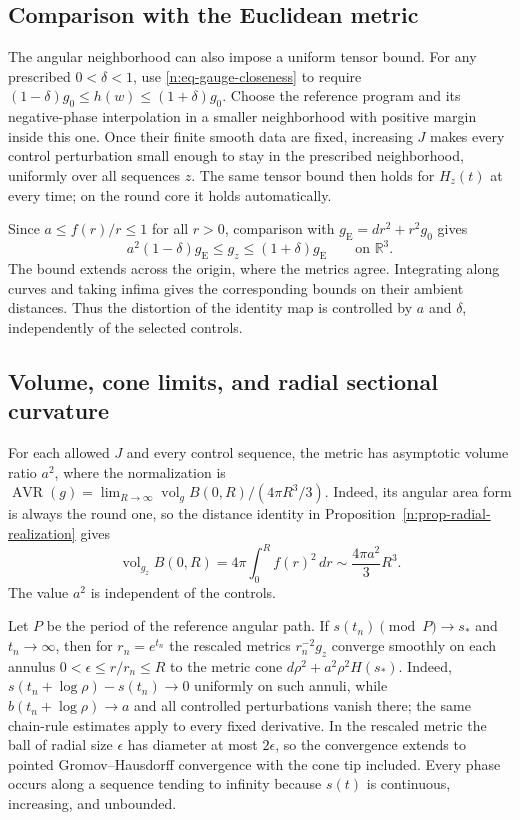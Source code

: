\subsection{Comparison with the Euclidean metric}
The angular neighborhood can also impose a uniform tensor bound. For
any prescribed $0<\delta<1$, use \eqref{n:eq-gauge-closeness} to require
$(1-\delta)g_0\le h(w)\le(1+\delta)g_0$.
Choose the reference program and its negative-phase interpolation in a
smaller neighborhood with positive margin inside this one. Once their
finite smooth data are fixed, increasing $J$ makes every control
perturbation small enough to stay in the prescribed neighborhood,
uniformly over all sequences $z$. The same tensor bound then holds for
$H_z(t)$ at every time; on the round core it holds automatically.

Since $a\le f(r)/r\le1$ for all $r>0$, comparison with
$g_{\mathrm E}=dr^2+r^2g_0$ gives
\begin{equation}\label{n:eq-global-tensor-comparison}
 a^2(1-\delta)g_{\mathrm E}\le g_z\le(1+\delta)g_{\mathrm E}
 \qquad\text{on }\mathbb R^3.
\end{equation}
The bound extends across the origin, where the metrics agree. Integrating
along curves and taking infima gives the corresponding bounds on their
ambient distances. Thus the distortion of the identity map is controlled
by $a$ and $\delta$, independently of the selected controls.

\subsection{Volume, cone limits, and radial sectional curvature}\label{n:geometric-consequences}
For each allowed $J$ and every control sequence, the metric has
asymptotic volume ratio $a^2$, where the normalization is
$\operatorname{AVR}(g)=\lim_{R\to\infty}\operatorname{vol}_g B(0,R)/(4\pi R^3/3)$.  Indeed, its angular
area form is always the round one, so the distance identity in
Proposition~\ref{n:prop-radial-realization} gives
\[
 \operatorname{vol}_{g_z}B(0,R)
   =4\pi\int_0^R f(r)^2\,dr
   \sim \frac{4\pi a^2}{3}R^3.
\]
The value $a^2$ is independent of the controls.

Let $P$ be the period of the reference angular path.  If
$s(t_n)\pmod P\to s_*$ and $t_n\to\infty$, then for
$r_n=e^{t_n}$ the rescaled metrics $r_n^{-2}g_z$ converge smoothly on
each annulus $0<\epsilon\le r/r_n\le R$ to the metric cone
$d\rho^2+a^2\rho^2H(s_*)$.  Indeed,
$s(t_n+\log\rho)-s(t_n)\to0$ uniformly on such annuli, while
$b(t_n+\log\rho)\to a$ and all controlled perturbations vanish there;
the same chain-rule estimates apply to every fixed derivative.  In the
rescaled metric the ball of radial size $\epsilon$ has diameter at most
$2\epsilon$, so the convergence extends to pointed Gromov--Hausdorff
convergence with the cone tip included. Every phase occurs along a
sequence tending to infinity because $s(t)$ is continuous, increasing,
and unbounded.

